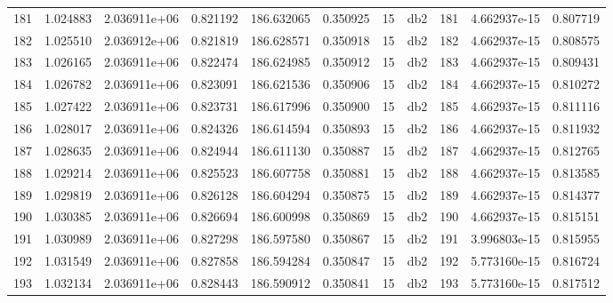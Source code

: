 \begin{tabular}{lrrrrrrlrrr}
181  &    1.024883 &        2.036911e+06 &  0.821192 &              186.632065 &    0.350925 &      15 &          db2 &    181 &   4.662937e-15 &      0.807719 \\
182  &    1.025510 &        2.036912e+06 &  0.821819 &              186.628571 &    0.350918 &      15 &          db2 &    182 &   4.662937e-15 &      0.808575 \\
183  &    1.026165 &        2.036911e+06 &  0.822474 &              186.624985 &    0.350912 &      15 &          db2 &    183 &   4.662937e-15 &      0.809431 \\
184  &    1.026782 &        2.036911e+06 &  0.823091 &              186.621536 &    0.350906 &      15 &          db2 &    184 &   4.662937e-15 &      0.810272 \\
185  &    1.027422 &        2.036911e+06 &  0.823731 &              186.617996 &    0.350900 &      15 &          db2 &    185 &   4.662937e-15 &      0.811116 \\
186  &    1.028017 &        2.036911e+06 &  0.824326 &              186.614594 &    0.350893 &      15 &          db2 &    186 &   4.662937e-15 &      0.811932 \\
187  &    1.028635 &        2.036911e+06 &  0.824944 &              186.611130 &    0.350887 &      15 &          db2 &    187 &   4.662937e-15 &      0.812765 \\
188  &    1.029214 &        2.036911e+06 &  0.825523 &              186.607758 &    0.350881 &      15 &          db2 &    188 &   4.662937e-15 &      0.813585 \\
189  &    1.029819 &        2.036911e+06 &  0.826128 &              186.604294 &    0.350875 &      15 &          db2 &    189 &   4.662937e-15 &      0.814377 \\
190  &    1.030385 &        2.036911e+06 &  0.826694 &              186.600998 &    0.350869 &      15 &          db2 &    190 &   4.662937e-15 &      0.815151 \\
191  &    1.030989 &        2.036911e+06 &  0.827298 &              186.597580 &    0.350867 &      15 &          db2 &    191 &   3.996803e-15 &      0.815955 \\
192  &    1.031549 &        2.036911e+06 &  0.827858 &              186.594284 &    0.350847 &      15 &          db2 &    192 &   5.773160e-15 &      0.816724 \\
193  &    1.032134 &        2.036911e+06 &  0.828443 &              186.590912 &    0.350841 &      15 &          db2 &    193 &   5.773160e-15 &      0.817512 \\

\end{tabular}
